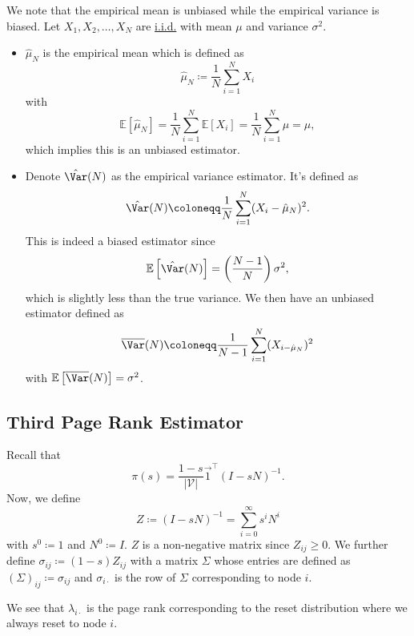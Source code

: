 \begin{note}
	We note that the empirical mean is unbiased while the empirical variance is biased. Let \(X_1, X_2, \dots  ,X_N\) are \hyperref[def:i.i.d.]{i.i.d.} with mean \(\mu\) and variance \(\sigma^2\).
	\begin{itemize}
		\item\(\hat{\mu}_N\) is the empirical mean which is defined as
		      \[
			      \hat{\mu}_N \coloneqq  \frac{1}{N}\sum\limits_{i=1}^{N} X_i
		      \]
		      with
		      \[
			      \mathbb{E}\left[\hat{\mu}_N \right] = \frac{1}{N}\sum\limits_{i=1}^{N} \mathbb{E}\left[X_i \right] = \frac{1}{N}\sum\limits_{i=1}^{N} \mu = \mu,
		      \]
		      which implies this is an unbiased estimator.
		\item Denote \(\hat{\Var}(N)\) as the empirical variance estimator. It's defined as
		      \[
			      \hat{\Var}(N) \coloneqq \frac{1}{N}\sum\limits_{i=1}^{N} (X_i - \hat{\mu}_N)^2.
		      \]
		      This is indeed a biased estimator since
		      \[
			      \mathbb{E}\left[\hat{\Var}(N) \right]  = \left(\frac{N-1}{N}\right) \sigma^2,
		      \]
		      which is slightly less than the true variance. We then have an unbiased estimator defined as
		      \[
			      \overline{\Var}(N) \coloneqq  \frac{1}{N-1}\sum\limits_{i=1}^{N} (X_{i-\hat{\mu}_N})^2
		      \]
		      with \(\mathbb{E}\left[\overline{\Var}(N) \right]  = \sigma^2\).
	\end{itemize}
\end{note}

\subsection{Third Page Rank Estimator}\label{subsec:third-page-rank-estimator}
Recall that
\[
	\pi(s) = \frac{1 - s}{\left\vert \mathcal{V}  \right\vert}\vec{1}^{\top} (I - sN)^{-1}.
\]
Now, we define
\[
	Z \coloneqq (I - sN)^{-1} = \sum\limits_{i=0}^{\infty} s^i N^i
\]
with \(s^0\coloneqq 1\) and \(N^0\coloneqq I\). \(Z\) is a non-negative matrix since \(Z_{ij}\geq 0\). We further define \(\sigma_{ij}\coloneqq (1 - s)Z_{ij}\) with a matrix \(\Sigma \) whose entries are defined as \(\left(\Sigma\right)_{ij}\coloneqq \sigma_{ij}\) and \(\sigma_{i\cdot}\) is the row of \(\Sigma\) corresponding to node \(i\).

\begin{remark}
	We see that \(\lambda _{i\cdot}\) is the page rank corresponding to the reset distribution where we always reset to node \(i\).
\end{remark}

